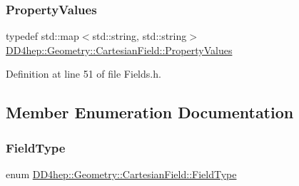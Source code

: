 \hypertarget{class_d_d4hep_1_1_geometry_1_1_cartesian_field_a05dc63b1528e795f7d877d3fb236c394}{}\label{class_d_d4hep_1_1_geometry_1_1_cartesian_field_a05dc63b1528e795f7d877d3fb236c394} 
\subsubsection{\texorpdfstring{Property\+Values}{PropertyValues}}
{\footnotesize\ttfamily typedef std\+::map$<$std\+::string, std\+::string$>$ \hyperlink{class_d_d4hep_1_1_geometry_1_1_cartesian_field_a05dc63b1528e795f7d877d3fb236c394}{D\+D4hep\+::\+Geometry\+::\+Cartesian\+Field\+::\+Property\+Values}}



Definition at line 51 of file Fields.\+h.



\subsection{Member Enumeration Documentation}
\hypertarget{class_d_d4hep_1_1_geometry_1_1_cartesian_field_aa56ad95ffc11f27e7e793c9479680b78}{}\label{class_d_d4hep_1_1_geometry_1_1_cartesian_field_aa56ad95ffc11f27e7e793c9479680b78} 
\subsubsection{\texorpdfstring{Field\+Type}{FieldType}}
{\footnotesize\ttfamily enum \hyperlink{class_d_d4hep_1_1_geometry_1_1_cartesian_field_aa56ad95ffc11f27e7e793c9479680b78}{D\+D4hep\+::\+Geometry\+::\+Cartesian\+Field\+::\+Field\+Type}}


